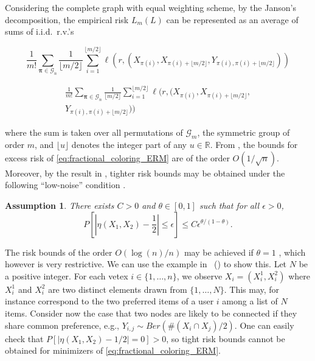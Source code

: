 \documentclass[letterpaper]{article} %
\def\DoubleColumn{}
\def\DoubleColumnEnd{}
\def\SingleColumn{}
\def\SingleColumnEnd{}
\newtheorem{assumption}{Assumption}
\newcommand{\Pro}{P}
\newcommand{\real}{\mathbb{R}}
\newcommand{\empiricalrisk}[1]{L_{#1}}
\newcommand{\set}[1]{\{#1\}}
\newcommand{\citet}[1]{\citeauthor{#1}\ (\citeyear{#1})}
\begin{document}
Considering the complete graph with equal weighting scheme, by the Janson's decomposition, the empirical risk $\empiricalrisk{m}(L)$ can be represented as an average of sums of i.i.d.\ r.v.'s
\SingleColumn
\begin{equation}
  \label{eq:fractional_coloring_ERM}
  \frac{1}{m!}\sum_{\bm{\pi}\in\mathcal{G}_n}\frac{1}{\lfloor m/2\rfloor}\sum_{i=1}^{\lfloor m/2 \rfloor} \ell(r, (X_{\pi(i)}, X_{\pi(i)+\lfloor m/2\rfloor}, Y_{\pi(i), \pi(i)+\lfloor m/2\rfloor}))
\end{equation}
\SingleColumnEnd
\DoubleColumn
\begin{equation}
\begin{aligned}
  \label{eq:fractional_coloring_ERM}
  \frac{1}{m!}\sum_{\bm{\pi}\in\mathcal{G}_n}\frac{1}{\lfloor m/2\rfloor}\sum_{i=1}^{\lfloor m/2 \rfloor} \ell(r, (X_{\pi(i)}, X_{\pi(i)+\lfloor m/2\rfloor}, \\
  Y_{\pi(i), \pi(i)+\lfloor m/2\rfloor}))
  \end{aligned}
\end{equation}
\DoubleColumnEnd
where the sum is taken over all permutations of $\mathcal{G}_m$, the symmetric group of order $m$, and $\lfloor u \rfloor$ denotes the integer part of any $u\in \real{}$.
From \cite{Biau2006}, the bounds for excess risk of \eqref{eq:fractional_coloring_ERM} are of the order $O(1/\sqrt{n})$.
Moreover, by the result in \cite{DBLP:conf/icml/RalaivolaA15}, tighter risk bounds may be obtained under the following ``low-noise'' condition \cite{tsybakov2004optimal,Massart2006}.
\begin{assumption}
  There exists $C>0$ and $\theta\in [0,1]$ such that for all $\epsilon>0$,
  \[\Pro\left[|\eta(X_1,X_2)-\frac{1}{2}|\le \epsilon\right]\le C\epsilon^{\theta/(1-\theta)}.\]
\end{assumption}
The risk bounds of the order $O(\log(n)/n)$ may be achieved if $\theta=1$ \cite{Massart2006}, which however is very restrictive.
We can use the example in \citet{papa2016graph} to show this.
Let $N$ be a positive integer. For each vetex $i \in \set{1,\dots,n}$, we observe $X_i = (X_i^1, X_i^2)$ where $X_i^1$ and $X_i^2$ are two distinct elements drawn from $\set{1,\dots,N}$.
This may, for instance correspond to the two preferred items of a user $i$ among a list of $N$ items.
Consider now the case that two nodes are likely to be connected if they share common preference, e.g., $Y_{i,j} \sim Ber(\#(X_i\cap X_j)/2)$. One can easily check that $\Pro[|\eta(X_1,X_2)-1/2|=0]>0$, so tight risk bounds cannot be obtained for minimizers of \eqref{eq:fractional_coloring_ERM}.
\end{document}
